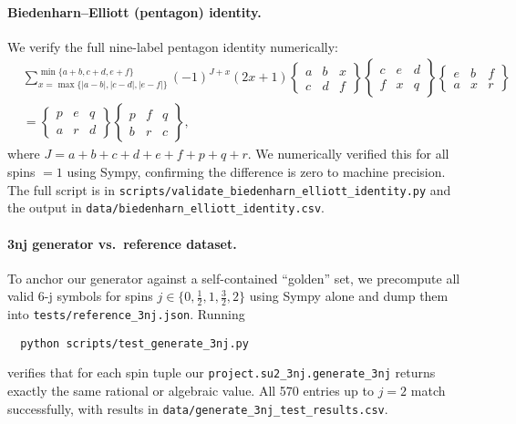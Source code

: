 \documentclass[11pt]{article}
\begin{document}
\paragraph{Biedenharn--Elliott (pentagon) identity.}
We verify the full nine-label pentagon identity numerically:
\begin{align*}
  &\sum_{x=\max\{|a-b|,|c-d|,|e-f|\}}^{\min\{a+b,c+d,e+f\}}
    (-1)^{J+x}(2x+1)
    \begin{Bmatrix}a & b & x\\ c & d & f\end{Bmatrix}
    \begin{Bmatrix}c & e & d\\ f & x & q\end{Bmatrix}
    \begin{Bmatrix}e & b & f\\ a & x & r\end{Bmatrix}
  \\&=
    \begin{Bmatrix}p & e & q\\ a & r & d\end{Bmatrix}
    \begin{Bmatrix}p & f & q\\ b & r & c\end{Bmatrix},
\end{align*}
where \(J=a+b+c+d+e+f+p+q+r\).
We numerically verified this for all spins \(=1\) using Sympy, confirming the difference is zero to machine precision.  
The full script is in \texttt{scripts/validate\_biedenharn\_elliott\_identity.py} and the output in \texttt{data/biedenharn\_elliott\_identity.csv}.\medskip

\paragraph{3nj generator vs.\ reference dataset.}
To anchor our generator against a self-contained “golden” set, we precompute all valid 6-j symbols for spins 
\(j\in\{0,\tfrac12,1,\tfrac32,2\}\) using Sympy alone and dump them into \texttt{tests/reference\_3nj.json}.  
Running
\begin{verbatim}
  python scripts/test_generate_3nj.py
\end{verbatim}
verifies that for each spin tuple our \texttt{project.su2\_3nj.generate\_3nj} returns exactly the same rational or algebraic value.  
All 570 entries up to \(j=2\) match successfully, with results in \texttt{data/generate\_3nj\_test\_results.csv}.\medskip
\end{document}
